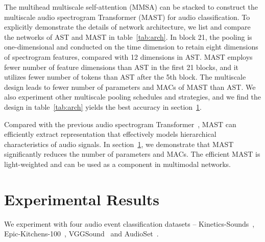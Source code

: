 \documentclass{article}
\begin{document}
The multihead multiscale self-attention (MMSA) can be stacked to construct the multiscale audio spectrogram Transformer (MAST) for audio classification. To explicitly demonstrate the details of network architecture, we list and compare the networks of AST and MAST in table~\ref{tab:arch}. In block 21, the pooling is one-dimensional and conducted on the time dimension to retain eight dimensions of spectrogram features, compared with 12 dimensions in AST. MAST employs fewer number of feature dimensions than AST in the first 21 blocks, and it utilizes fewer number of tokens than AST after the 5th block. The multiscale design leads to fewer number of parameters and MACs of MAST than AST. We also experiment other multiscale pooling schedules and strategies, and we find the design in table~\ref{tab:arch} yields the best accuracy in section~\ref{sec:result}.












































Compared with the previous audio spectrogram Transformer~\cite{gong2021ast}, MAST can efficiently extract representation that effectively models hierarchical characteristics of audio signals. In section~\ref{sec:result}, we demonstrate that MAST significantly reduces the number of parameters and MACs. The efficient MAST is light-weighted and can be used as a component in multimodal networks.

\section{Experimental Results}
\label{sec:result}
We experiment with four audio event classification datasets – Kinetics-Sounds~\cite{arandjelovic2017look,kay2017kinetics}, Epic-Kitchens-100~\cite{Damen2021RESCALING,Damen2018EPICKITCHENS,Damen2021PAMI}, VGGSound~\cite{chen2020vggsound} and AudioSet~\cite{gemmeke2017audio}. 
\end{document}
